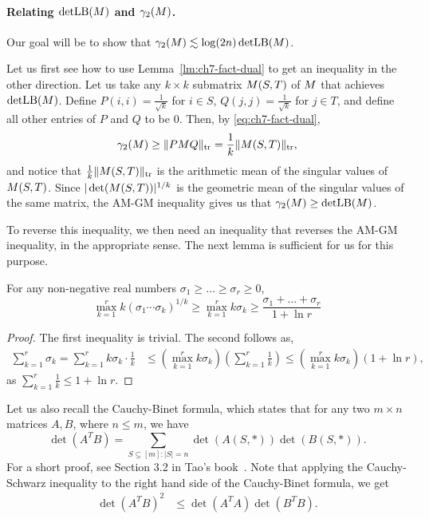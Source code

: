\paragraph{Relating $\operatorname{detLB}(M)$ and $\gamma_2(M)$.}
Our goal will be to show that $\gamma_2(M)\lesssim \log(2n) \operatorname{detLB}(M)$. 

Let us first see how to use
Lemma~\ref{lm:ch7-fact-dual} to get an inequality in the other
direction. Let us take any $k\times k$ submatrix $M(S,T)$ of $M$ that
achieves $\operatorname{detLB}(M)$. Define $P(i,i) = \frac{1}{\sqrt{k}}$ for $i \in S$,
$Q(j,j) = \frac{1}{\sqrt{k}}$ for $j \in T$, and define all other entries of $P$
and $Q$ to be $0$. Then, by \eqref{eq:ch7-fact-dual},
\[
  \gamma_2(M) \ge \|PM Q\|_{\operatorname{tr}} = \frac1k \|M(S,T)\|_{\operatorname{tr}},
\]
and notice that $\frac1k \|M(S,T)\|_{\operatorname{tr}}$ is the arithmetic mean of
the singular values of $M(S,T)$. Since $|\det(M(S,T))|^{1/k}$ is
the geometric mean of the singular values of the same matrix, the
AM-GM inequality gives us that
$\gamma_2(M) \ge \operatorname{detLB}(M)$.  

To reverse this inequality, we
then need an inequality that reverses the AM-GM inequality, in the
appropriate sense. The next lemma is sufficient for us for this
purpose. %

\begin{lemma}\label{lm:ch7-rev-AMGM}
  For any non-negative real numbers $\sigma_1 \ge \ldots \ge
  \sigma_r \ge 0$,
  \[
    \max_{k = 1}^r k(\sigma_1 \cdots \sigma_k)^{1/k}
    \ge
    \max_{k = 1}^r k\sigma_k
    \ge
    \frac{\sigma_1 + \ldots + \sigma_r}{1+\ln r}
  \]
\end{lemma}
\begin{proof}
  The first inequality is trivial. The second
  follows as,
  \begin{align*}
    \sum_{k = 1}^r \sigma_k =
    \sum_{k = 1}^r k\sigma_k\cdot\frac{1}{k}
    &\le \left(\max_{k = 1}^r k\sigma_k\right)\left(\sum_{k=1}^r \frac{1}{k}\right)
    \le \left(\max_{k = 1}^r k\sigma_k\right)(1+\ln r),
  \end{align*}
  as $\sum_{k=1}^r \frac{1}{k} \le 1 + \ln r$.
\end{proof}

Let us also recall the Cauchy-Binet formula, which states that for any
two $m\times n$ matrices $A,B$, where $n \le m$, we have
\[
  \det(A^T B) = \sum_{S \subseteq [m]: |S| = n} \det(A(S,*))\det(B(S,*)).
\]
For a short proof, see Section 3.2 in Tao's
book~\cite{Tao-randmat}. Note that applying the Cauchy-Schwarz
inequality to the right hand side of the Cauchy-Binet formula, we get
\begin{align}
  \det(A^T B)^2 &\le
     \det(A^T A) \det(B^T B).  \label{eq:ch7-CS-mat}
\end{align}

